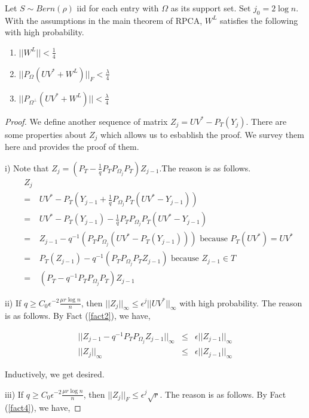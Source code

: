 \begin{thm}
Let $S\sim Bern(\rho)$ iid for each entry with $\Omega$ as its support set. Set $j_{0}=2\log n$. With the assumptions in the main theorem of RPCA, $W^{L}$ satisfies the following with high probability. 
\begin{enumerate}
\item $||W^{L}||<\frac{1}{4}$ 
\item $||P_{\Omega}(UV^{*}+W^{L})||_{F}<\frac{\lambda}{4}$ 
\item $||P_{\Omega^{\bot}}(UV^{*}+W^{L})||<\frac{\lambda}{4}$ 
\end{enumerate}
\end{thm}

\begin{proof}
We define another sequence of matrix $Z_{j}=UV^{*}-P_{T}(Y_{j})$. There are some properties about $Z_{j}$ which allows us to esbablish the proof. We survey them here and provides the proof of them. 

i) Note that $Z_{j}=(P_{T}-\frac{1}{q}P_{T}P_{\Omega_{j}}P_{T})Z_{j-1}.$The reason is as follows.
\begin{eqnarray*}
 & Z_{j}\\
 & = & UV^{*}-P_{T}(Y_{j-1}+\frac{1}{q}P_{\Omega_{j}}P_{T}(UV^{*}-Y_{j-1}))\\
 & = & UV^{*}-P_{T}(Y_{j-1})-\frac{1}{q}P_{T}P_{\Omega_{j}}P_{T}(UV^{*}-Y_{j-1})\\
 & = & Z_{j-1}-q^{-1}(P_{T}P_{\Omega_{j}}(UV^{*}-P_{T}(Y_{j-1})))\text{ because }P_{T}(UV^{*})=UV^{*}\\
 & = & P_{T}(Z_{j-1})-q^{-1}(P_{T}P_{\Omega_{j}}P_{T}Z_{j-1})\text{ because }Z_{j-1}\in T\\
 & = & (P_{T}-q^{-1}P_{T}P_{\Omega_{j}}P_{T})Z_{j-1}
\end{eqnarray*}


ii) If $q\ge C_{0}\epsilon^{-2}\frac{\mu r\log n}{n}$, then $||Z_{j}||_{\infty}\le\epsilon^{j}||UV^{*}||_{\infty}$ with high probability. The reason is as follows. By Fact (\ref{fact2}), we have, 

\begin{eqnarray*}
||Z_{j-1}-q^{-1}P_{T}P_{\Omega_{j}}Z_{j-1}||_{\infty} & \le & \epsilon||Z_{j-1}||_{\infty}\\
||Z_{j}||_{\infty} & \le & \epsilon||Z_{j-1}||_{\infty}
\end{eqnarray*}


Inductively, we get desired.

iii) If $q\ge C_{0}\epsilon^{-2}\frac{\mu r\log n}{n}$, then $||Z_{j}||_{F}\le\epsilon^{j}\sqrt{r}$. The reason is as follows. By Fact (\ref{fact4}), we have, 


\end{proof}
